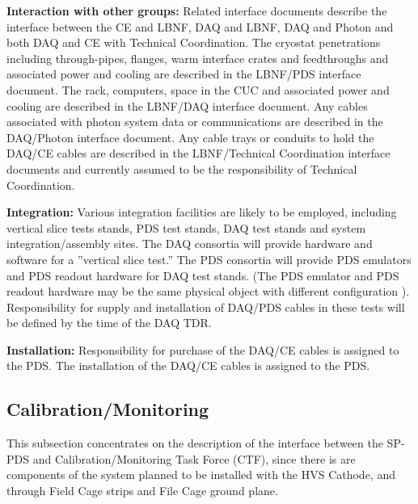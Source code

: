 \textbf{Interaction with other groups: }Related interface documents describe the interface between the CE and LBNF, DAQ and LBNF, DAQ and Photon and both DAQ and CE with Technical Coordination. The cryostat penetrations including through-pipes, flanges, warm interface crates and feedthroughs and associated power and cooling are described in the LBNF/PDS interface document.  The rack, computers, space in the CUC and associated power and cooling are described in the LBNF/DAQ interface document. Any cables associated with photon system data or communications are described in the DAQ/Photon interface document. Any cable trays or conduits to hold the DAQ/CE cables are described in the LBNF/Technical Coordination interface documents and currently assumed to be the responsibility of Technical Coordination.

\textbf{Integration:} Various integration facilities are likely to be employed, including vertical slice tests stands, PDS test stands, DAQ test stands and system integration/assembly sites. The DAQ consortia will provide hardware and software for a ''vertical slice test.'' The PDS consortia will provide PDS emulators and PDS readout hardware for DAQ test stands. (The PDS emulator and PDS readout hardware may be the same physical object with different configuration ). Responsibility for supply and installation of DAQ/PDS cables in these tests will be defined by the time of the DAQ TDR.

\textbf{Installation: }Responsibility for purchase of the DAQ/CE cables is assigned to the PDS. The installation of the  DAQ/CE cables is assigned to the PDS.


\subsection{Calibration/Monitoring}
\label{sec:fdsp-pd-intfc-calib}

This subsection concentrates on the description of the interface between the SP-PDS and Calibration/Monitoring Task Force (CTF), since there is are components of the system planned to be installed with the HVS Cathode, and through Field Cage strips and File Cage ground plane.

